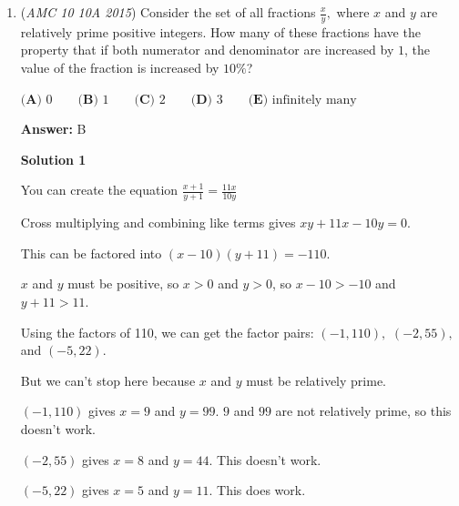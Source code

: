 \begin{enumerate}
 



\textbf{Solution 10 (Astronomy)}

Let the center of the disk be Planet X with orbit eccentricity $0$ and the center of the clock be the Sun. Note that the question would then be asking for the solar day of Planet X, rather than the sidereal day. Because planet X is rotating around its axis in the same direction as it is revolving around the Sun, the solar day can be calculated as $d_{solar}=\frac{1}{\frac{1}{y}+\frac{1}{d_{siderial}}}$, where $y$ is the length of the year of Planet X and $d_{siderial}$ is one sidereal day. It is easy to see that $y=12$ and $d_{siderial}=6$, therefore the answer is $\frac{1}{\frac{1}{12}+\frac{1}{6}}=\frac{1}{\frac{1}{4}}=\boxed{\textbf{(C) }4 \ \text{o' clock}}$~That one kid

 


	\item (\textit{AMC 10 10A 2015}) Consider the set of all fractions $\frac{x}{y},$ where $x$ and $y$ are relatively prime positive integers. How many of these fractions have the property that if both numerator and denominator are increased by $1$, the value of the fraction is increased by $10\%$?


 $\textbf{(A) }0\qquad\textbf{(B) }1\qquad\textbf{(C) }2\qquad\textbf{(D) }3\qquad\textbf{(E) }\text{infinitely many}$

 \textbf{Answer: }B



\textbf{Solution 1}

You can create the equation $\frac{x+1}{y+1}=\frac{11x}{10y}$

 Cross multiplying and combining like terms gives $xy + 11x - 10y = 0$.

 This can be factored into $(x - 10)(y + 11) = -110$.

 $x$ and $y$ must be positive, so $x > 0$ and $y > 0$, so $x - 10> -10$ and $y + 11 > 11$.

 Using the factors of 110, we can get the factor pairs: $(-1, 110),$ $(-2, 55),$ and $(-5, 22).$

 But we can't stop here because $x$ and $y$ must be relatively prime.

 $(-1, 110)$ gives $x = 9$ and $y = 99$. $9$ and $99$ are not relatively prime, so this doesn't work.

 $(-2, 55)$ gives $x = 8$ and $y = 44$. This doesn't work.

 $(-5, 22)$ gives $x = 5$ and $y = 11$. This does work.


\end{enumerate}
